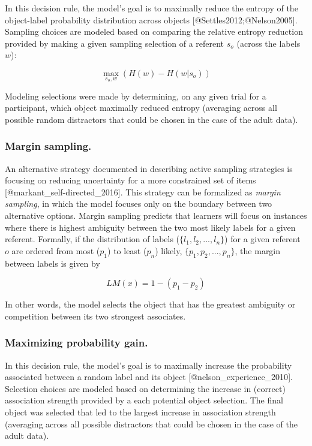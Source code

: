 \documentclass[10pt, letterpaper]{article}
\begin{document}
In this decision rule, the model's goal is to maximally reduce the
entropy of the object-label probability distribution across objects
{[}@Settles2012;@Nelson2005{]}. Sampling choices are modeled based on
comparing the relative entropy reduction provided by making a given
sampling selection of a referent \(s_o\) (across the labels \(w\)):

\begin{equation}
\max_{s_o,w}({H(w)-H(w|s_o)})
\label{eq:entropy_reduction}
\end{equation}

Modeling selections were made by determining, on any given trial for a
participant, which object maximally reduced entropy (averaging across
all possible random distractors that could be chosen in the case of the
adult data).

\subsubsection{Margin sampling.}\label{margin-sampling.}

An alternative strategy documented in describing active sampling
strategies is focusing on reducing uncertainty for a more constrained
set of items {[}@markant\_self-directed\_2016{]}. This strategy can be
formalized as \emph{margin sampling}, in which the model focuses only on
the boundary between two alternative options. Margin sampling predicts
that learners will focus on instances where there is highest ambiguity
between the two most likely labels for a given referent. Formally, if
the distribution of labels (\(\{l_1,l_2,...,l_n\}\)) for a given
referent \(o\) are ordered from most (\(p_1\)) to least (\(p_n\))
likely, \(\{p_1,p_2,...,p_n\}\), the margin between labels is given by

\begin{equation}
LM(x) = 1 - (p_1 - p_2)
\label{eq:margin_sampling}
\end{equation}

In other words, the model selects the object that has the greatest
ambiguity or competition between its two strongest associates.

\subsubsection{Maximizing probability
gain.}\label{maximizing-probability-gain.}

In this decision rule, the model's goal is to maximally increase the
probability associated between a random label and its object
{[}@nelson\_experience\_2010{]}. Selection choices are modeled based on
determining the increase in (correct) association strength provided by a
each potential object selection. The final object was selected that led
to the largest increase in association strength (averaging across all
possible distractors that could be chosen in the case of the adult
data).
\end{document}
